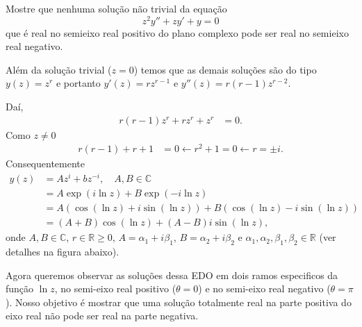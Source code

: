 \documentclass[a4paper,12pt, leqno, answers]{exam}
\begin{document}
\begin{questions}
    \question[T3 de 2012] Mostre que nenhuma solu\c{c}\~{a}o n\~{a}o trivial da equa\c{c}\~{a}o
    \[
    z^2 y'' + z y' + y = 0
    \]
    que \'{e} real no semieixo real positivo do plano complexo pode ser real no semieixo real negativo.
    \begin{solution}
        Al\'{e}m da solu\c{c}\~{a}o trivial ($z = 0$) temos que as demais solu\c{c}\~{o}es s\~{a}o do tipo $y(z) = z^r$ e portanto $y'(z) = r z^{r - 1}$ e $y''(z) = r (r - 1) z^{r -2}$.

        Da\'{i},
        \begin{align*}
            r \left( r - 1 \right) z^r + r z^r + z^r &= 0.
        \end{align*}
        Como $z \neq 0$
        \begin{align*}
            r \left( r - 1 \right) + r + 1 &= 0 \leftarrow r^2 + 1 = 0 \leftarrow r = \pm i.
        \end{align*}
        Consequentemente
        \begin{align*}
            y(z) &= A z^i + b z^{-i}, \quad  A, B \in \mathbb{C} \\
            &= A \exp\left( i \ln z \right) + B \exp\left( -i \ln z \right) \\
            &= A \left( \cos\left( \ln z \right) + i \sin\left( \ln z \right) \right) + B \left( \cos\left( \ln z \right) - i \sin \left( \ln z \right) \right) \\
            &= \left( A + B \right) \cos\left( \ln z \right) + \left( A - B \right) i \sin\left( \ln z \right),
        \end{align*}
        onde $A, B \in \mathbb{C}$, $r \in \mathbb{R} \geq 0$, $A = \alpha_1 + i \beta_1$, $B = \alpha_2 + i \beta_2$ e $\alpha_1, \alpha_2, \beta_1, \beta_2 \in \mathbb{R}$ (ver detalhes na figura abaixo).
        \begin{center}
        \end{center}

        Agora queremos observar as solu\c{c}\~{o}es dessa EDO em dois ramos especificos da fun\c{c}\~{a}o $\ln z$, no semi-eixo real positivo ($\theta = 0$) e no semi-eixo real negativo ($\theta = \pi$). Nosso objetivo \'{e} mostrar que uma solu\c{c}\~{a}o totalmente real na parte positiva do eixo real n\~{a}o pode ser real na parte negativa.


\end{solution}
\end{questions}
\end{document}

